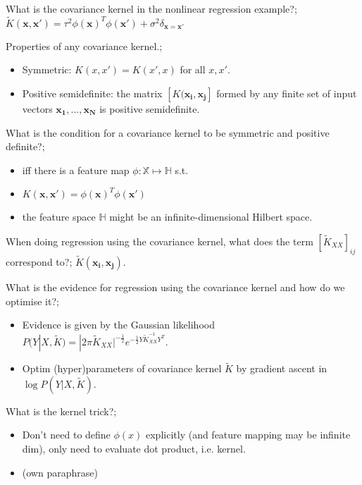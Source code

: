 \documentclass{article}
\begin{document}
What is the covariance kernel in the nonlinear regression example?; $\tilde{K}(\mathbf{x, x'})=\tau^2\phi(\mathbf{x})^T\phi(\mathbf{x}')+\sigma^2\delta_{\mathbf{x}=\mathbf{x}'}$

Properties of any covariance kernel.; \begin{itemize}
    \item Symmetric: $K(x, x')=K(x', x)$ for all $x, x'$.
    \item Positive semidefinite: the matrix $[K(\mathbf{x_i, x_j}]$ formed by any finite set of input vectors $\mathbf{x_1, ..., x_N}$ is positive semidefinite.
\end{itemize}

What is the condition for a covariance kernel to be symmetric and positive definite?; \begin{itemize}
    \item iff there is a feature map $\phi:\mathbb{X}\mapsto\mathbb{H}$ s.t. 
    \item $K(\mathbf{x, x'})=\phi(\mathbf{x})^T\phi(\mathbf{x'})$
    \item the feature space $\mathbb{H}$ might be an infinite-dimensional Hilbert space.
\end{itemize}

When doing regression using the covariance kernel, what does the term $[\tilde{K}_{XX}]_{ij}$ correspond to?; $\tilde{K}(\mathbf{x_i, x_j})$.

What is the evidence for regression using the covariance kernel and how do we optimise it?; \begin{itemize}
    \item Evidence is given by the Gaussian likelihood $P(Y|X, \tilde{K})=|2\pi\tilde{K}_{XX}|^{-\frac{1}{2}}e^{-\frac{1}{2}Y\tilde{K}_{XX}^{-1}Y^T}$.
    \item Optim (hyper)parameters of covariance kernel $\tilde{K}$ by gradient ascent in $\log P(Y|X, \tilde{K})$.
\end{itemize}

What is the kernel trick?; \begin{itemize}
    \item Don't need to define $\phi(x)$ explicitly (and feature mapping may be infinite dim), only need to evaluate dot product, i.e. kernel.
    \item (own paraphrase)
\end{itemize}
\end{document}
